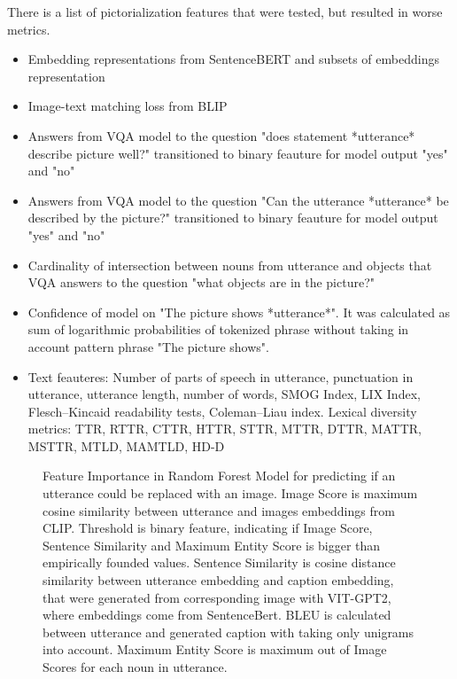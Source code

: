 There is a list of pictorialization features that were tested, but resulted in worse metrics. 
\begin{itemize}
    \item Embedding representations from SentenceBERT and subsets of embeddings representation
    \item Image-text matching loss from BLIP
    \item Answers from VQA model to the question "does statement *utterance* describe picture well?" transitioned to binary feauture for model output "yes" and "no" 
    \item Answers from VQA model to the question "Can the utterance *utterance* be described by the picture?" transitioned to binary feauture for model output "yes" and "no" 
    \item Cardinality of intersection between nouns from utterance and objects that VQA answers to the question "what objects are in the picture?"
    \item Confidence of model on "The picture shows *utterance*". It was calculated as sum of logarithmic probabilities of tokenized phrase without taking in account pattern phrase "The picture shows".
    \item Text feauteres: Number of parts of speech in utterance, punctuation in utterance, utterance length, number of words, SMOG Index, LIX Index, Flesch–Kincaid readability tests, Coleman–Liau index. Lexical diversity metrics: TTR, RTTR, CTTR, HTTR, STTR, MTTR, DTTR, MATTR, MSTTR, MTLD, MAMTLD, HD-D \cite{ruTS}
\end{itemize}

 
\begin{figure}[h]
\centering
\caption{Feature Importance in Random Forest Model for predicting if an utterance could be replaced with an image. Image Score is maximum cosine similarity between utterance and images embeddings from CLIP. Threshold is binary feature, indicating if Image Score, Sentence Similarity and Maximum Entity Score is bigger than empirically founded values. Sentence Similarity is cosine distance similarity between utterance embedding and caption embedding, that were generated from corresponding image with VIT-GPT2, where embeddings come from SentenceBert. BLEU is calculated between utterance and generated caption with taking only unigrams into account. Maximum Entity Score is maximum out of Image Scores for each noun in utterance.}
\label{pictorialization::FI}
\end{figure}




